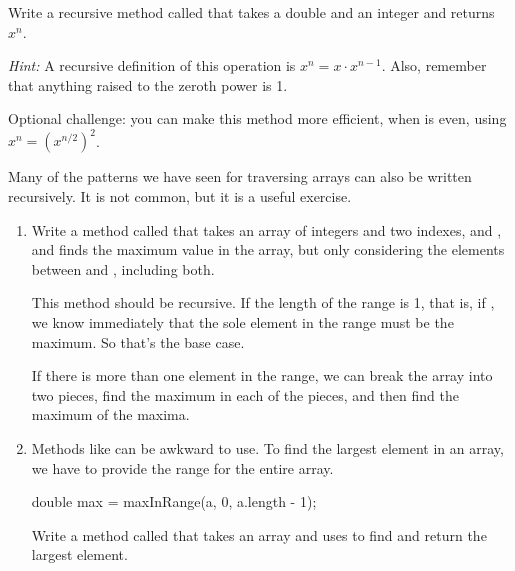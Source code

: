\begin{exercise}  %
\label{ex.power}

Write a recursive method called  that takes a double  and an integer  and returns $x^n$.

{\it Hint:} A recursive definition of this operation is $x^n = x \cdot x^{n-1}$.
Also, remember that anything raised to the zeroth power is 1.

Optional challenge: you can make this method more efficient, when  is even, using $x^n = \left( x^{n/2} \right)^2$.

\end{exercise}


\begin{exercise}  %

Many of the patterns we have seen for traversing arrays can also be written recursively.
It is not common, but it is a useful exercise.

\begin{enumerate}

\item Write a method called  that takes an array of integers and two indexes,  and , and finds the maximum value in the array, but only considering the elements between  and , including both.

This method should be recursive.
If the length of the range is 1, that is, if , we know immediately that the sole element in the range must be the maximum.
So that's the base case.

If there is more than one element in the range, we can break the array into two pieces, find the maximum in each of the pieces, and then find the maximum of the maxima.

\item Methods like  can be awkward to use.
To find the largest element in an array, we have to provide the range for the entire array.

\begin{code}
double max = maxInRange(a, 0, a.length - 1);
\end{code}

Write a method called  that takes an array and uses  to find and return the largest element.

\end{enumerate}

\end{exercise}


